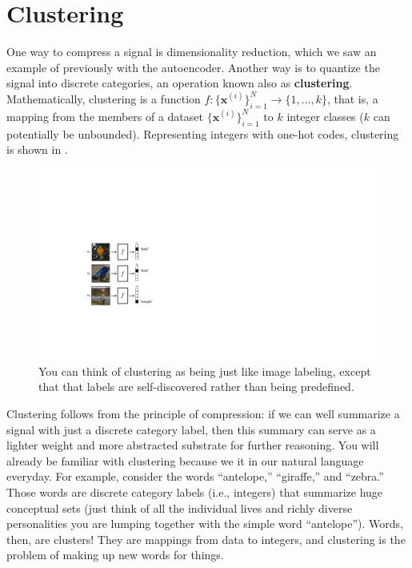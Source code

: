 \section{Clustering}
One way to compress a signal is dimensionality reduction, which we saw an example of previously with the autoencoder. Another way is to quantize the signal into discrete categories, an operation known also as {\bf clustering}. Mathematically, clustering is a function $f: \{\mathbf{x}^{(i)}\}_{i=1}^N \rightarrow \{1,\dots,k\}$, that is, a mapping from the members of a dataset $\{\mathbf{x}^{(i)}\}_{i=1}^N$ to $k$ integer classes ($k$ can potentially be unbounded). Representing integers with one-hot codes, clustering is shown in \fig{\ref{fig:representation_learning:clustering_f_diagram}}.
\begin{figure}[h!]
    \centerline{
        \includegraphics[width=0.4\linewidth]{figures/representation_learning/clustering_f_diagram.pdf}
    }
    \caption{You can think of clustering as being just like image labeling, except that that labels are self-discovered rather than being predefined.}
    \label{fig:representation_learning:clustering_f_diagram}
  \vspace{-1.0em}
\end{figure}


Clustering follows from the principle of compression: if we can well summarize a signal with just a discrete category label, then this summary can serve as a lighter weight and more abstracted substrate for further reasoning. You will already be familiar with clustering because we it in our natural language everyday. For example, consider the words ``antelope,'' ``giraffe,'' and ``zebra.'' Those words are discrete category labels (i.e., integers) that summarize huge conceptual sets (just think of all the individual lives and richly diverse personalities you are lumping together with the simple word ``antelope''). Words, then, are clusters! They are mappings from data to integers, and clustering is the problem of making up new words for things.

